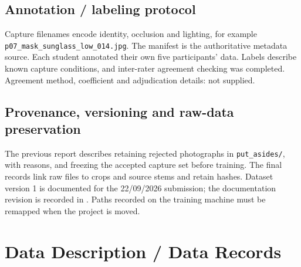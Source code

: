 \documentclass[11pt,a4paper]{article}
\newcommand{\code}[1]{\texttt{#1}}
\newcommand{\nextpage}{\clearpage}
\begin{document}
\subsection{Annotation / labeling protocol}
Capture filenames encode identity, occlusion and lighting, for example \code{p07\_mask\_sunglass\_low\_014.jpg}. The manifest is the authoritative metadata source. Each student annotated their own five participants' data. Labels describe known capture conditions, and inter-rater agreement checking was completed. Agreement method, coefficient and adjudication details: not supplied.
\subsection{Provenance, versioning and raw-data preservation}
The previous report describes retaining rejected photographs in \code{put\_asides/}, with reasons, and freezing the accepted capture set before training. The final records link raw files to crops and source stems and retain hashes. Dataset version 1 is documented for the 22/09/2026 submission; the documentation revision is recorded in . Paths recorded on the training machine must be remapped when the project is moved.

\nextpage
\section{Data Description / Data Records}
\end{document}
